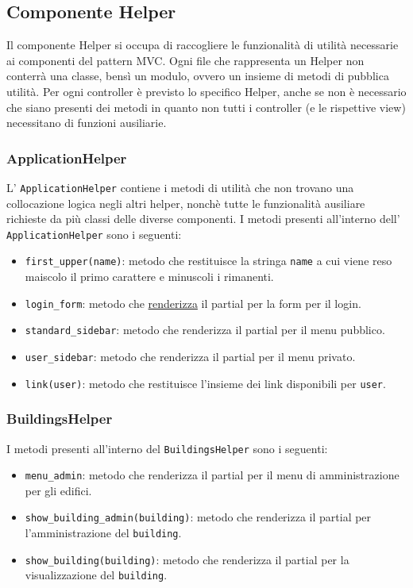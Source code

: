 \documentclass[11pt,a4paper]{article}
\begin{document}
\subsection{Componente Helper}\label{helper}
Il componente Helper si occupa di raccogliere le funzionalità di utilità necessarie ai componenti del pattern MVC. Ogni file che rappresenta un Helper non conterrà una classe, bensì un modulo, ovvero un insieme di metodi di pubblica utilità. Per ogni controller è previsto lo specifico Helper, anche se non è necessario che siano presenti dei metodi in quanto non tutti i controller (e le rispettive view) necessitano di funzioni ausiliarie.
\subsubsection{ApplicationHelper}
L' \verb|ApplicationHelper| contiene i metodi di utilità che non trovano una collocazione logica negli altri helper, nonchè tutte le funzionalità ausiliare richieste da più classi delle diverse componenti.
I metodi presenti all'interno dell' \verb|ApplicationHelper| sono i seguenti:
\begin{itemize}
 \item \verb|first_upper(name)|: metodo che restituisce la stringa \verb|name| a cui viene reso maiscolo il primo carattere e minuscoli i rimanenti.
 \item \verb|login_form|: metodo che \underline{renderizza} il partial per la form per il login.
 \item \verb|standard_sidebar|: metodo che renderizza il partial per il menu pubblico.
 \item \verb|user_sidebar|: metodo che renderizza il partial per il menu privato.
 \item \verb|link(user)|: metodo che restituisce l'insieme dei link disponibili per \verb|user|.
\end{itemize}
\subsubsection{BuildingsHelper}
I metodi presenti all'interno del \verb|BuildingsHelper| sono i seguenti:
\begin{itemize}
 \item \verb|menu_admin|: metodo che renderizza il partial per il menu di amministrazione per gli edifici.
 \item \verb|show_building_admin(building)|: metodo che renderizza il partial per l'amministrazione del \verb|building|.
 \item \verb|show_building(building)|: metodo che renderizza il partial per la visualizzazione del \verb|building|.
\end{itemize}
\end{document}
